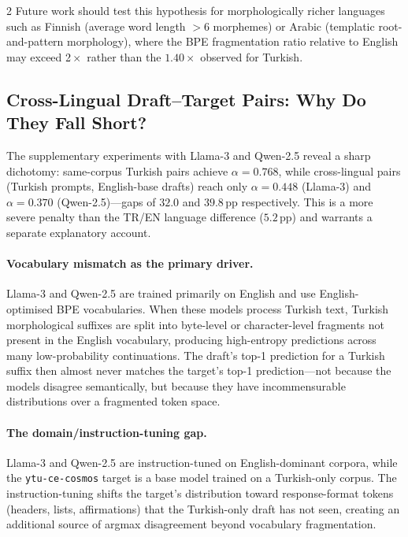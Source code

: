 \documentclass[11pt,a4paper]{article}
\begin{document}
\begin{multicols}{2}
Future work should test this hypothesis for morphologically richer
languages such as Finnish (average word length $>$6 morphemes) or Arabic
(templatic root-and-pattern morphology), where the BPE fragmentation
ratio relative to English may exceed 2$\!\times$ rather than the
$1.40\!\times$ observed for Turkish.

\subsection{Cross-Lingual Draft--Target Pairs: Why Do They Fall Short?}
\label{sec:disc-crosslingual}

The supplementary experiments with Llama-3 and Qwen-2.5 reveal a sharp
dichotomy: same-corpus Turkish pairs achieve $\alpha=0.768$, while
cross-lingual pairs (Turkish prompts, English-base drafts) reach only
$\alpha=0.448$ (Llama-3) and $\alpha=0.370$ (Qwen-2.5)—gaps of
$32.0$ and $39.8$\,pp respectively.
This is a more severe penalty than the TR/EN language difference
($5.2$\,pp) and warrants a separate explanatory account.

\paragraph{Vocabulary mismatch as the primary driver.}
Llama-3 and Qwen-2.5 are trained primarily on English and use
English-optimised BPE vocabularies.
When these models process Turkish text, Turkish morphological suffixes
are split into byte-level or character-level fragments not present in
the English vocabulary, producing high-entropy predictions across many
low-probability continuations.
The draft's top-1 prediction for a Turkish suffix then almost never
matches the target's top-1 prediction—not because the models disagree
semantically, but because they have incommensurable distributions over
a fragmented token space.

\paragraph{The domain/instruction-tuning gap.}
Llama-3 and Qwen-2.5 are instruction-tuned on English-dominant corpora,
while the \texttt{ytu-ce-cosmos} target is a base model trained on a
Turkish-only corpus.
The instruction-tuning shifts the target's distribution toward
response-format tokens (headers, lists, affirmations) that the
Turkish-only draft has not seen, creating an additional source of
argmax disagreement beyond vocabulary fragmentation.


\end{multicols}
\end{document}
